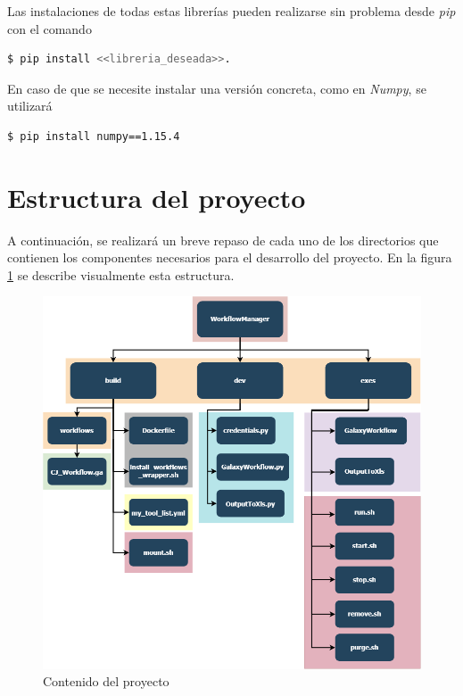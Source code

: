         Las instalaciones de todas estas librerías pueden realizarse sin problema desde \textit{pip} con el comando
        \begin{lstlisting}[language=bash]
        $ pip install <<libreria_deseada>>.
        \end{lstlisting} 
        En caso de que se necesite instalar una versión concreta, como en \textit{Numpy}, se utilizará
        \begin{lstlisting}[language=bash]
        $ pip install numpy==1.15.4
        \end{lstlisting} 

\section{Estructura del proyecto}

A continuación, se realizará un breve repaso de cada uno de los directorios que contienen los componentes necesarios para el desarrollo del proyecto. En la figura \ref{fig:ContenidoDelProyecto} se describe visualmente esta estructura.

\begin{figure}
    \begin{center}
      \includegraphics[scale=0.4]{images/FolderStructure.png}
      \caption{Contenido del proyecto}
      \label{fig:ContenidoDelProyecto}
    \end{center}
\end{figure}

